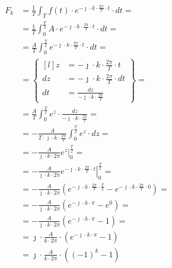 \begin{task}
\begin{align*}
F_k&=\frac{1}{T}\int_{T}f(t) \cdot e^{-\jmath \cdot k \cdot \frac{2\pi}{T} \cdot t} \cdot dt=\\
&=\frac{1}{T}\int_{0}^{\frac{T}{2}}A \cdot e^{-\jmath \cdot k \cdot \frac{2\pi}{T} \cdot t} \cdot dt=\\
&=\frac{A}{T}\int_{0}^{\frac{T}{2}} e^{-\jmath \cdot k \cdot \frac{2\pi}{T} \cdot t} \cdot dt=\\
&=\begin{Bmatrix*}[l]
z&=-\jmath \cdot k\cdot \frac{2\pi}{T} \cdot t\\
dz&=-\jmath \cdot k\cdot \frac{2\pi}{T} \cdot dt\\
dt&=\frac{dz}{-\jmath \cdot k\cdot \frac{2\pi}{T}}
\end{Bmatrix*}=\\
&=\frac{A}{T}\int_{0}^{\frac{T}{2}} e^{z} \cdot \frac{dz}{-\jmath \cdot k\cdot \frac{2\pi}{T}}=\\
&=-\frac{A}{T \cdot \jmath \cdot k\cdot \frac{2\pi}{T}}\int_{0}^{\frac{T}{2}} e^{z} \cdot dz=\\
&=-\frac{A}{\jmath \cdot k\cdot 2 \pi}\left. e^{z} \right|_{0}^{\frac{T}{2}}=\\
&=-\frac{A}{\jmath \cdot k\cdot 2 \pi}\left. e^{-\jmath \cdot k\cdot \frac{2\pi}{T} \cdot t} \right|_{0}^{\frac{T}{2}}=\\
&=-\frac{A}{\jmath \cdot k\cdot 2 \pi}\left( e^{-\jmath \cdot k\cdot \frac{2\pi}{T} \cdot \frac{T}{2}} - e^{-\jmath \cdot k\cdot \frac{2\pi}{T} \cdot 0}\right)=\\
&=-\frac{A}{\jmath \cdot k\cdot 2 \pi}\left( e^{ -\jmath \cdot k\cdot \pi } - e^{ 0}\right)=\\
&=-\frac{A}{\jmath \cdot k\cdot 2 \pi}\left( e^{ -\jmath \cdot k\cdot \pi } - 1\right)=\\
&=\jmath \cdot \frac{A}{k\cdot 2 \pi}\cdot \left( e^{-\jmath \cdot k\cdot \pi } -1 \right)\\
&=\jmath \cdot \frac{A}{k\cdot 2 \pi}\cdot \left( (-1)^{k} -1 \right)
\end{align*}




\end{task}
